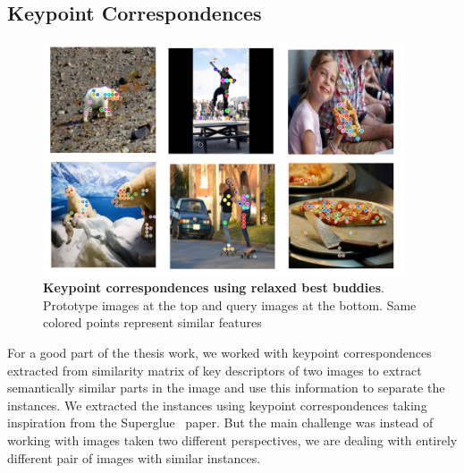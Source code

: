 \subsection{Keypoint Correspondences}
\begin{figure}
	\centering
	\includegraphics[width=0.95\textwidth]{Images/main/correspondences.png}
	\caption[\textbf{Keypoint correspondences using relaxed best buddies}]{\textbf{Keypoint correspondences using relaxed best buddies}. Prototype images at the top and query images at the bottom. Same colored points represent similar features }
	\label{fig:correspondecences}
\end{figure}

For a good part of the thesis work, we worked with keypoint correspondences extracted from similarity matrix of key descriptors of two images to extract semantically similar parts in the image and use this information to separate the instances. We extracted the instances using keypoint correspondences taking inspiration from the Superglue~\cite{sarlin2020supergluelearningfeaturematching} paper. But the main challenge was instead of working with images taken two different perspectives, we are dealing with entirely different pair of images with similar instances.

